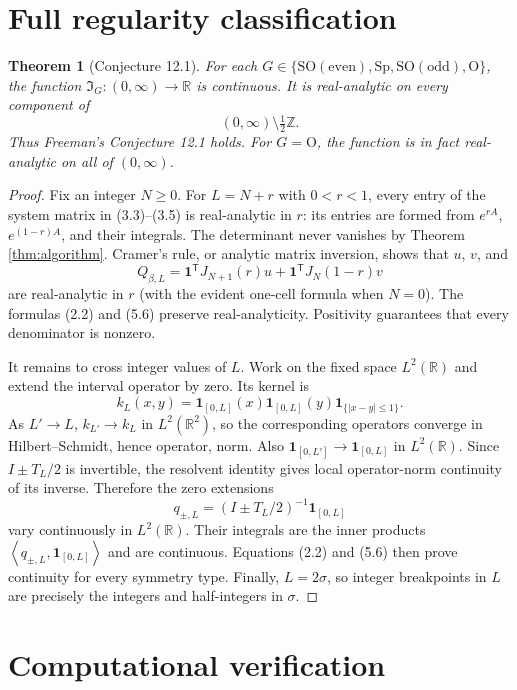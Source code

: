 \documentclass[11pt]{article}
\newtheorem{theorem}{Theorem}
\theoremstyle{definition}
\theoremstyle{remark}
\newcommand{\1}{\mathbf 1}
\newcommand{\R}{\mathbb R}
\newcommand{\Sp}{\mathrm{Sp}}
\newcommand{\SOe}{\mathrm{SO(even)}}
\newcommand{\SOo}{\mathrm{SO(odd)}}
\newcommand{\OO}{\mathrm O}
\newcommand{\ip}[2]{\left\langle #1,#2\right\rangle}
\begin{document}
\section{Full regularity classification}

\begin{theorem}[Conjecture 12.1]\label{thm:regularity}
For each $G\in\{\SOe,\Sp,\SOo,\OO\}$, the function
$\mathfrak I_G:(0,\infty)\to\R$ is continuous. It is real-analytic on every
component of
\[
 (0,\infty)\setminus\tfrac12\mathbb Z.
\]
Thus Freeman's Conjecture 12.1 holds. For $G=\OO$, the function is in fact
real-analytic on all of $(0,\infty)$.
\end{theorem}

\begin{proof}
Fix an integer $N\geq0$. For $L=N+r$ with $0<r<1$, every entry of the system
matrix in (3.3)--(3.5) is real-analytic in $r$: its entries are formed from
$e^{rA}$, $e^{(1-r)A}$, and their integrals. The determinant never vanishes
by Theorem \ref{thm:algorithm}. Cramer's rule, or analytic matrix inversion,
shows that $u$, $v$, and
\[
 Q_{\beta,L}
 =\mathbf 1^\mathsf TJ_{N+1}(r)u
  +\mathbf 1^\mathsf TJ_N(1-r)v                          \tag{6.1}
\]
are real-analytic in $r$ (with the evident one-cell formula when $N=0$).
The formulas (2.2) and (5.6) preserve real-analyticity. Positivity guarantees
that every denominator is nonzero.

It remains to cross integer values of $L$. Work on the fixed space
$L^2(\R)$ and extend the interval operator by zero. Its kernel is
\[
 k_L(x,y)=\1_{[0,L]}(x)\1_{[0,L]}(y)\1_{\{|x-y|\leq1\}}.
                                                               \tag{6.2}
\]
As $L'\to L$, $k_{L'}\to k_L$ in $L^2(\R^2)$, so the corresponding
operators converge in Hilbert--Schmidt, hence operator, norm. Also
$\1_{[0,L']}\to\1_{[0,L]}$ in $L^2(\R)$. Since
$I\pm T_L/2$ is invertible, the resolvent identity gives local
operator-norm continuity of its inverse. Therefore the zero extensions
\[
 q_{\pm,L}=(I\pm T_L/2)^{-1}\1_{[0,L]}
\]
vary continuously in $L^2(\R)$. Their integrals are the inner products
$\ip{q_{\pm,L}}{\1_{[0,L]}}$ and are continuous. Equations (2.2) and (5.6)
then prove continuity for every symmetry type. Finally, $L=2\sigma$, so
integer breakpoints in $L$ are precisely the integers and half-integers in
$\sigma$.
\end{proof}

\section{Computational verification}
\end{document}
